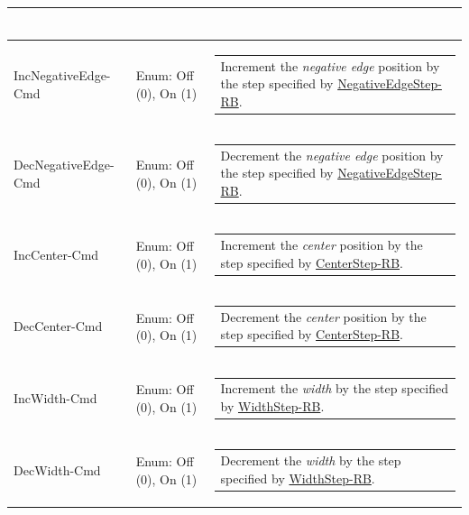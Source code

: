 \documentclass[openany]{article}
\begin{document}
\begin{longtable}{| m{4.5cm} m{2.5cm}  m{7.0cm} |}
\begin{tabular}{@{}m{6cm}@{}}
            \end{tabular} \hypertarget{pv:inc-negative-edge-cmd}{}\\ \hline
        IncNegativeEdge-Cmd & Enum: Off (0), On (1) & \begin{tabular}{@{}m{6cm}@{}}
                Increment the \emph{negative edge} position by the step specified by \hyperlink{pv:negative-edge-step}{NegativeEdgeStep-RB}.
            \end{tabular} \hypertarget{pv:dec-negative-edge-cmd}{}\\ \hline
        DecNegativeEdge-Cmd & Enum: Off (0), On (1) & \begin{tabular}{@{}m{6cm}@{}}
                Decrement the \emph{negative edge} position by the step specified by \hyperlink{pv:negative-edge-step}{NegativeEdgeStep-RB}.
            \end{tabular} \hypertarget{pv:inc-center-cmd}{}\\ \hline
        IncCenter-Cmd & Enum: Off (0), On (1) & \begin{tabular}{@{}m{6cm}@{}}
                Increment the \emph{center} position by the step specified by \hyperlink{pv:center-step}{CenterStep-RB}.
            \end{tabular} \hypertarget{pv:dec-center-cmd}{}\\ \hline
        DecCenter-Cmd & Enum: Off (0), On (1) & \begin{tabular}{@{}m{6cm}@{}}
                Decrement the \emph{center} position by the step specified by \hyperlink{pv:center-step}{CenterStep-RB}.
            \end{tabular} \hypertarget{pv:inc-width-cmd}{}\\ \hline
        IncWidth-Cmd & Enum: Off (0), On (1) & \begin{tabular}{@{}m{6cm}@{}}
                Increment the \emph{width} by the step specified by \hyperlink{pv:width-step}{WidthStep-RB}.
            \end{tabular} \hypertarget{pv:dec-width-cmd}{}\\ \hline
        DecWidth-Cmd & Enum: Off (0), On (1) & \begin{tabular}{@{}m{6cm}@{}}
                Decrement the \emph{width} by the step specified by \hyperlink{pv:width-step}{WidthStep-RB}.
            \end{tabular} \hypertarget{}{}\\ \hline
    \end{longtable}
\end{document}
